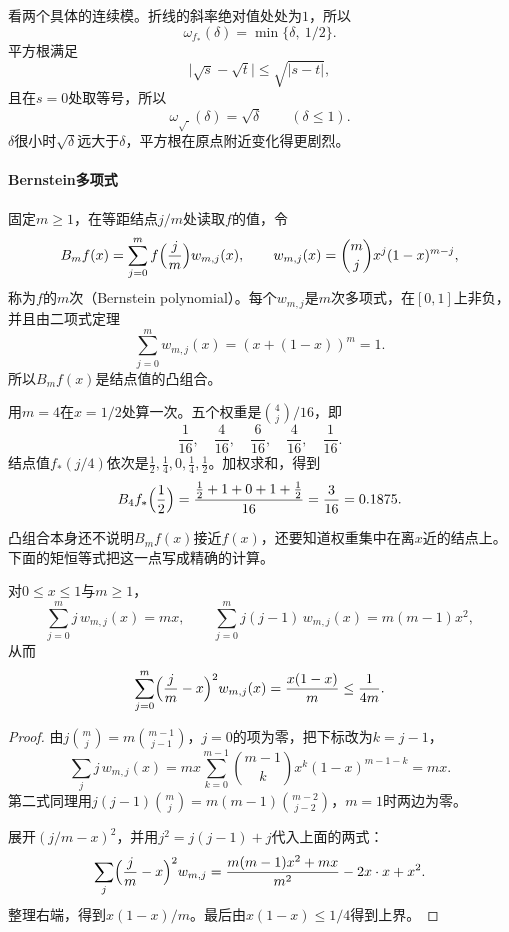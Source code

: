 看两个具体的连续模。折线的斜率绝对值处处为$1$，所以
\[
 \omega_{f_*}(\delta)=\min\{\delta,\ 1/2\}.
\]
平方根满足
\[
 \lvert\sqrt s-\sqrt t\rvert\leq\sqrt{\lvert s-t\rvert},
\]
且在$s=0$处取等号，所以
\[
 \omega_{\sqrt{\cdot}}(\delta)=\sqrt\delta\qquad(\delta\leq1).
\]
$\delta$很小时$\sqrt\delta$远大于$\delta$，平方根在原点附近变化得更剧烈。

\paragraph{Bernstein多项式}
固定$m\geq1$，在等距结点$j/m$处读取$f$的值，令
\begin{equation}
 B_mf(x)=\sum_{j=0}^{m}f\Bigl(\frac jm\Bigr)w_{m,j}(x),\qquad w_{m,j}(x)=\binom mjx^j(1-x)^{m-j},
 \label{eq:fapprox-bernstein}
\end{equation}
称为$f$的$m$次（Bernstein polynomial）。每个$w_{m,j}$是$m$次多项式，在$[0,1]$上非负，并且由二项式定理
\[
 \sum_{j=0}^mw_{m,j}(x)=(x+(1-x))^m=1 .
\]
所以$B_mf(x)$是结点值的凸组合。

用$m=4$在$x=1/2$处算一次。五个权重是$\binom4j/16$，即
\[
 \frac1{16},\quad\frac4{16},\quad\frac6{16},\quad\frac4{16},\quad\frac1{16}.
\]
结点值$f_*(j/4)$依次是$\frac12,\frac14,0,\frac14,\frac12$。加权求和，得到
\[
 B_4f_*\Bigl(\frac12\Bigr)=\frac{\frac12+1+0+1+\frac12}{16}=\frac3{16}=0.1875 .
\]

凸组合本身还不说明$B_mf(x)$接近$f(x)$，还要知道权重集中在离$x$近的结点上。下面的矩恒等式把这一点写成精确的计算。

\begin{lemma}[Bernstein权重的矩]
\label{lem:fapprox-bernstein-moments}
对$0\leq x\leq1$与$m\geq1$，
\begin{equation}
 \sum_{j=0}^mj\,w_{m,j}(x)=mx,\qquad \sum_{j=0}^mj(j-1)\,w_{m,j}(x)=m(m-1)x^2 ,
 \label{eq:fapprox-bernstein-moments}
\end{equation}
从而
\begin{equation}
 \sum_{j=0}^m\Bigl(\frac jm-x\Bigr)^2w_{m,j}(x)=\frac{x(1-x)}m\leq\frac1{4m}.
 \label{eq:fapprox-bernstein-variance}
\end{equation}
\end{lemma}

\begin{proof}
由$j\binom mj=m\binom{m-1}{j-1}$，$j=0$的项为零，把下标改为$k=j-1$，
\[
 \sum_jj\,w_{m,j}(x)=mx\sum_{k=0}^{m-1}\binom{m-1}kx^k(1-x)^{m-1-k}=mx .
\]
第二式同理用$j(j-1)\binom mj=m(m-1)\binom{m-2}{j-2}$，$m=1$时两边为零。

展开$(j/m-x)^2$，并用$j^2=j(j-1)+j$代入上面的两式：
\[
 \sum_j\Bigl(\frac jm-x\Bigr)^2w_{m,j}=\frac{m(m-1)x^2+mx}{m^2}-2x\cdot x+x^2 .
\]
整理右端，得到$x(1-x)/m$。最后由$x(1-x)\leq1/4$得到上界。
\end{proof}

